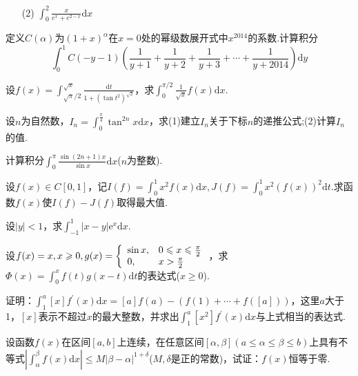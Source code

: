 \begin{xiti}
\begin{enumerate}
	\item [(2)]$\int _ { 0 } ^ { 2 } \frac { x } { e ^ { x } + e ^ { 2 - x } }\mathrm { d } x$
\end{enumerate}
\item 定义$C(\alpha)$为$(1+x)^{\alpha}$在$x=0$处的幂级数展开式中$x^{2014}$的系数.计算积分
\[\int _ { 0 } ^ { 1 } C ( - y - 1 ) \left( \frac { 1 } { y + 1 } + \frac { 1 } { y + 2 } + \frac { 1 } { y + 3 } + \cdots + \frac { 1 } { y + 2014 } \right) \mathrm { d } y\]
\item 设$f ( x ) = \int _ { \sqrt { \pi } / 2 } ^ { \sqrt { x } } \frac { \mathrm { d } t } { 1 + \left( \tan t ^ { 2 } \right) ^ { \sqrt { 2 } } }$，求$\int _ { 0 } ^ { \pi / 2 } \frac { 1 } { \sqrt { x } } f ( x ) \mathrm { d } x$.
\item 设$n$为自然数，$I _ { n } = \int _ { 0 } ^ { \frac { \pi } { 4 } } \tan ^ { 2 n } x \mathrm { d } x$，求(1)建立$I_{n}$关于下标$n$的递推公式;(2)计算$I_{n}$的值.
\item 计算积分$\int _ { 0 } ^ { \pi } \frac { \sin ( 2 n + 1 ) x } { \sin x } \mathrm { d } x$\quad ($n$为整数).
\item 设$f ( x ) \in C [ 0,1 ]$，记$I ( f ) = \int _ { 0 } ^ { 1 } x ^ { 2 } f ( x ) \mathrm { d } x , J ( f ) = \int _ { 0 } ^ { 1 } x ^ { 2 } ( f ( x ) ) ^ { 2 } \mathrm { d } t$.求函数$f(x)$使$I ( f ) - J ( f )$取得最大值.
\item 设$|y|<1$，求$\int _ { - 1 } ^ { 1 } | x - y | \mathrm { e } ^ { x } \mathrm { d } x$.
\item 设$f ( x ) = x , x \geqslant 0 , g ( x ) = \left\{ \begin{array} { l l } { \sin x , } & { 0 \leqslant x \leqslant \frac { \pi } { 2 } } \\ { 0 , } & { x > \frac { \pi } { 2 } } \end{array} \right.$，求$\Phi ( x ) = \int _ { 0 } ^ { x } f ( t ) g ( x - t ) \mathrm { d } t$的表达式($x\geq 0$).
\item 证明：$\int _ { 1 } ^ { a } [ x ] f ^ { \prime } ( x ) \mathrm { d } x = [ a ] f ( a ) - ( f ( 1 ) + \cdots + f ( [ a ] ) )$，这里$a$大于1，$[x]$表示不超过$x$的最大整数，并求出$\int _ { 1 } ^ { a } \left[ x ^ { 2 } \right] f ^ { \prime } ( x ) \mathrm { d } x$与上式相当的表达式.
\item 设函数$f(x)$在区间$[a,b]$上连续，在任意区间$[ \alpha , \beta ] ( a \leqslant \alpha \leqslant \beta \leqslant b )$上具有不等式$\left| \int _ { \alpha } ^ { \beta } f ( x ) \mathrm { d } x \right| \leqslant M | \beta - \alpha | ^ { 1 + \delta }$($M,\delta$是正的常数)，试证：$f(x)$恒等于零.

\end{xiti}
